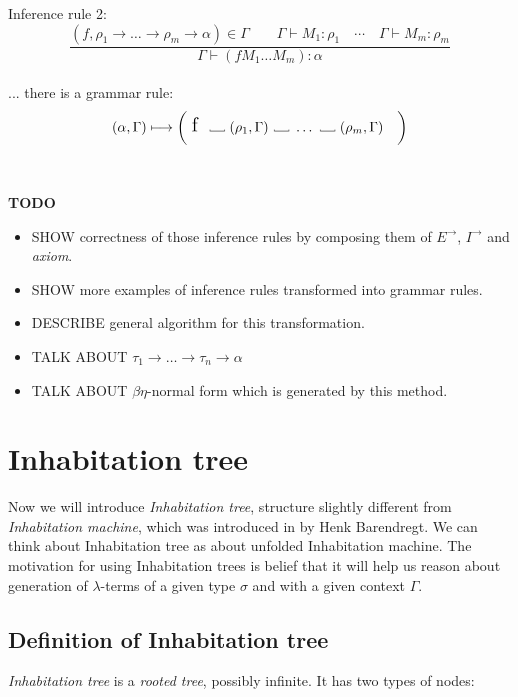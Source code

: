 \documentclass[12pt,a4paper]{report}
\newcommand\Vtextvisiblespace[1][.3em]{%
  \mbox{\kern.06em\vrule height.3ex}%
  \vbox{\hrule width#1}%
  \hbox{\vrule height.3ex}}
\begin{document}
Inference rule 2: 
\[
	\frac{ (f , \rho_1 \rightarrow \dots \rightarrow \rho_m \rightarrow \alpha ) \in \Gamma \qquad
	       \Gamma \vdash M_1 : \rho_1 \quad
	       \dotsm \quad
	       \Gamma \vdash M_m : \rho_m        
	      }
	     {\Gamma \vdash (f M_1 \dots M_m) : \alpha}
\]
\\
... there is a grammar rule:
\[ 
	( \alpha , \Gamma )  \longmapsto
	\bigg( \mbox{ {\Large f }}
	  \mbox{ \Vtextvisiblespace[1em] } 
	  ( \rho_1 , \Gamma )
	  \mbox{ \Vtextvisiblespace[1em] } 
	  \dots
	  \mbox{ \Vtextvisiblespace[1em] } 
	  ( \rho_m , \Gamma )
	  \quad \bigg)
\]
\\\\
\textbf{TODO} 
\begin{itemize}
	\item SHOW correctness of those inference rules by composing them of 
		  $E^{\rightarrow}$, $I^{\rightarrow}$ and \textit{axiom}.
	\item SHOW more examples of inference rules transformed into grammar rules.
	\item DESCRIBE general algorithm for this transformation.
	\item TALK ABOUT $\tau_1 \rightarrow \dots \rightarrow \tau_n \rightarrow \alpha$ 
	\item TALK ABOUT $\beta \eta$-normal form which is generated by this method.
\end{itemize}



\section{Inhabitation tree}

Now we will introduce \textit{Inhabitation tree}, structure slightly different from
\textit{Inhabitation machine}, which was introduced in \cite{barendregt10} by Henk Barendregt.
We can think about Inhabitation tree as about unfolded Inhabitation machine.
The motivation for using Inhabitation trees is belief that it will help us 
reason about generation of $\lambda$-terms 
of a given type $\sigma$ and with a given context $\Gamma$.  

\subsection{Definition of Inhabitation tree}

\textit{Inhabitation tree} is a \textit{rooted tree}, possibly infinite. 
It has two types of nodes:
\end{document}
